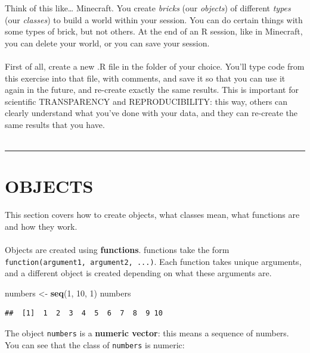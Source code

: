 \documentclass[
]{book}
\newenvironment{Shaded}{\begin{snugshade}}{\end{snugshade}}
\newcommand{\DecValTok}[1]{\textcolor[rgb]{0.00,0.00,0.81}{#1}}
\newcommand{\KeywordTok}[1]{\textcolor[rgb]{0.13,0.29,0.53}{\textbf{#1}}}
\newcommand{\NormalTok}[1]{#1}
\newcommand{\StringTok}[1]{\textcolor[rgb]{0.31,0.60,0.02}{#1}}
\begin{document}
Think of this like\ldots{} Minecraft. You create \emph{bricks} (our \emph{objects})
of different \emph{types} (our \emph{classes}) to build a world within your session. You
can do certain things with some types of brick, but not others. At the
end of an R session, like in Minecraft, you can delete your world, or you can
save your session.\\
~\\

First of all, create a new .R file in the folder of your choice. You'll type
code from this exercise into that file, with comments, and save it so that
you can use it again in the future, and re-create exactly the same results.
This is important for scientific TRANSPARENCY and REPRODUCIBILITY: this
way, others can clearly understand what you've done with your data, and
they can re-create the same results that you have.\\
~\\

\begin{center}\rule{0.5\linewidth}{\linethickness}\end{center}

\hypertarget{objects}{%
\section{OBJECTS}\label{objects}}

This section covers how to create objects, what classes mean, what functions
are and how they work.\\
~\\

Objects are created using \textbf{functions}. functions take the form
\texttt{function(argument1,\ argument2,\ ...)}. Each function takes unique arguments,
and a different object is created depending on what these arguments are.

\begin{Shaded}
\begin{Highlighting}[]
\NormalTok{numbers <-}\StringTok{ }\KeywordTok{seq}\NormalTok{(}\DecValTok{1}\NormalTok{, }\DecValTok{10}\NormalTok{, }\DecValTok{1}\NormalTok{)}
\NormalTok{numbers}
\end{Highlighting}
\end{Shaded}

\begin{verbatim}
##  [1]  1  2  3  4  5  6  7  8  9 10
\end{verbatim}

The object \texttt{numbers} is a \textbf{numeric vector}: this means a sequence of
numbers. You can see that the class of \texttt{numbers} is numeric:
\end{document}
